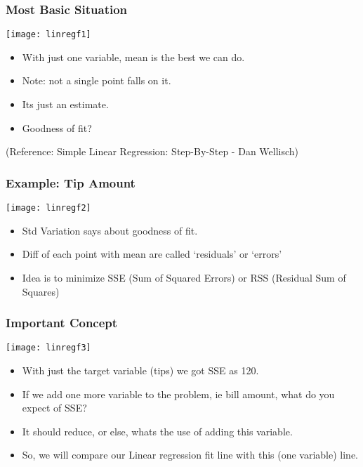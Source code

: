 \begin{frame}[fragile]\frametitle{Most Basic Situation}
\begin{center}
\texttt{[image: linregf1]}
\end{center}
\begin{itemize}
\item With just one variable, mean is the best we can do.
\item Note: not a single point falls on it.
\item Its just an estimate.
\item Goodness of fit?
\end{itemize}
\tiny{(Reference: Simple Linear Regression: Step-By-Step - Dan Wellisch)}
\end{frame}

\begin{frame}[fragile]\frametitle{Example: Tip Amount}
\begin{center}
\texttt{[image: linregf2]}
\end{center}
\begin{itemize}
\item Std Variation says about goodness of fit.
\item Diff of each point with mean are called `residuals' or `errors'
\item Idea is to minimize SSE (Sum of Squared Errors) or RSS (Residual Sum of Squares)
\end{itemize}
\end{frame}

\begin{frame}[fragile]\frametitle{Important Concept}
\begin{center}
\texttt{[image: linregf3]}
\end{center}
\begin{itemize}
\item With just the target variable (tips) we got SSE as 120.
\item If we add one more variable to the problem, ie bill amount, what do you expect of SSE?
\item It should reduce, or else, whats the use of adding this variable.
\item So, we will compare our Linear regression fit line with this (one variable) line.
\end{itemize}
\end{frame}

